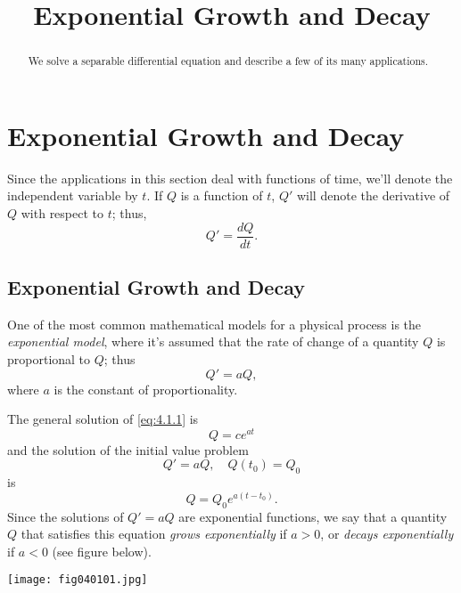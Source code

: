 \documentclass{ximera}
\title{Exponential Growth and Decay}%
\begin{document}
\begin{abstract}
We solve a separable differential equation and describe a few of its many applications.
\end{abstract}

\maketitle

\section*{Exponential Growth and Decay}

Since the applications in this section deal with functions of time, we'll
 denote the independent variable by $t$. If $Q$ is a function of
$t$, $Q'$ will denote the derivative of $Q$ with respect to $t$;
thus,
$$
Q'=\frac{dQ}{dt}.
$$

\subsection*{Exponential Growth and Decay}

One of the most common mathematical models for a physical process is
the \textit{exponential model}, where it's assumed that the rate
of change of a quantity $Q$ is proportional to $Q$; thus
\begin{equation} \label{eq:4.1.1}
Q'=aQ,
\end{equation}
 where $a$ is the constant of proportionality.

The general solution of
\eqref{eq:4.1.1} is
$$
Q=ce^{at}
$$
 and the solution of the initial value problem
$$
Q'=aQ, \quad Q(t_0)=Q_0
$$
 is
\begin{equation} \label{eq:4.1.2}
Q=Q_0e^{a(t-t_0)}.
\end{equation}
Since the solutions of $Q'=aQ$ are exponential functions, we say that
a
quantity $Q$ that satisfies this equation \textit{grows exponentially} if
$a > 0$, or \textit{decays exponentially} if $a < 0$ (see figure below).

\begin{image}
 \texttt{[image: fig040101.jpg]} 
\end{image}


\end{document}
